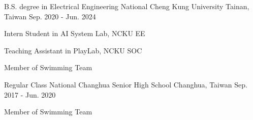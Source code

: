 

\begin{cventries}

  \cventry
  {B.S. degree in Electrical Engineering} %
  {National Cheng Kung University} %
  {Tainan, Taiwan} %
  {Sep. 2020 - Jun. 2024} %
  {
    \begin{cvitems} %
      \item {Intern Student in AI System Lab, NCKU EE}
      \item {Teaching Assistant in PlayLab, NCKU SOC}
      \item {Member of Swimming Team}
    \end{cvitems}
  }

  \cventry
  {Regular Class}
  {National Changhua Senior High School}
  {Changhua, Taiwan}
  {Sep. 2017 - Jun. 2020}
  {
    \begin{cvitems}
      \item {Member of Swimming Team}
    \end{cvitems}
  }

\end{cventries}
